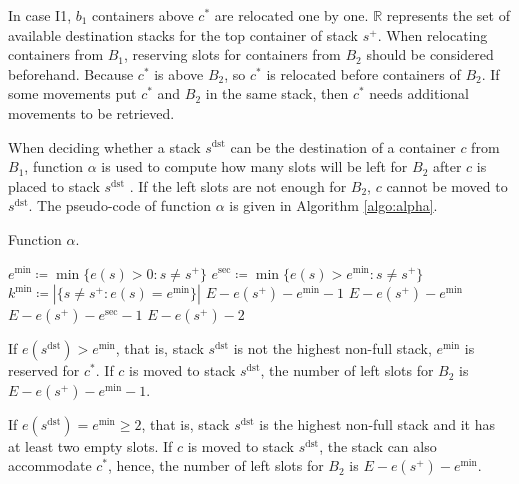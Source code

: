 \documentclass[review,3p,times,12pt,number]{elsarticle}\usepackage{amsmath}\usepackage{amssymb}
\renewcommand{\gets}{\coloneqq}
\newcommand{\mds}{s^\mathrm{dst}}
\newcommand{\setalgo}{\linespread{1}\fontsize{10}{12}\selectfont}
\begin{document}
In case I1, $b_1$ containers above $c^*$ are relocated one by one. $\mathbb R$ represents the set of available destination stacks for the top container of stack $s^+$.
When relocating containers from $B_1$, reserving slots for containers from $B_2$ should be considered beforehand. Because $c^*$ is above $B_2$, so $c^*$ is relocated before containers of $B_2$.
If some movements put $c^*$ and $B_2$ in the same stack, then $c^*$ needs additional movements to be retrieved.

When deciding whether a stack $s^{\text{dst}}$ can be the destination of a container $c$ from $B_1$, function $\alpha$ is used to compute how many slots will be left for $B_2$ after $c$ is placed to stack $s^{\text{dst}}$ .
If the left slots are not enough for $B_2$, $c$ cannot be moved to $s^{\text{dst}}$.
The pseudo-code of function $\alpha$ is given in Algorithm \ref{algo:alpha}.

\begin{algorithm}[htbp]

\caption{Function $\alpha$.}
\label{algo:alpha}
\setalgo
\begin{multicols}{2}
\Function{$\alpha(s^+,\mds)$}
        {\tcp{$s^+\neq \mds$}
            $e^{\min}\gets \min\{e(s)>0:s\neq s^+\}$\;
            $e^{\sec}\gets \min\{e(s)>e^{\min}:s\neq s^+\}$\;
            $k^{\min}\gets |\{s\neq s^+ : e(s)=e^{\min}\}|$\;
            \uIf{$e(\mds)> e^{\min}$}
            {
                \Return $E-e(s^+)-e^{\min}-1$\;
            }
            {
                \Return $E-e(s^+)-e^{\min}$\;
            }
            {
                \Return $E-e(s^+)-e^{\sec}-1$\;
            }
            \Else
            {
                \Return $E-e(s^+)-2$\;
            }
        }
\end{multicols}
\BlankLine
\BlankLine
\end{algorithm}

If $e(\mds)> e^{\min}$, that is, stack $\mds$ is not the highest non-full stack, $e^{\min}$ is reserved for $c^*$.
If $c$ is moved to stack $\mds$, the number of left slots for $B_2$ is $E-e(s^+)-e^{\min}-1$.

If $e(\mds)=e^{\min}\ge 2$, that is, stack $\mds$ is the highest non-full stack and it has at least two empty slots. If $c$ is moved to stack $\mds$, the stack can also accommodate $c^*$, hence, the number of left slots for $B_2$ is $E-e(s^+)-e^{\min}$.
\end{document}
